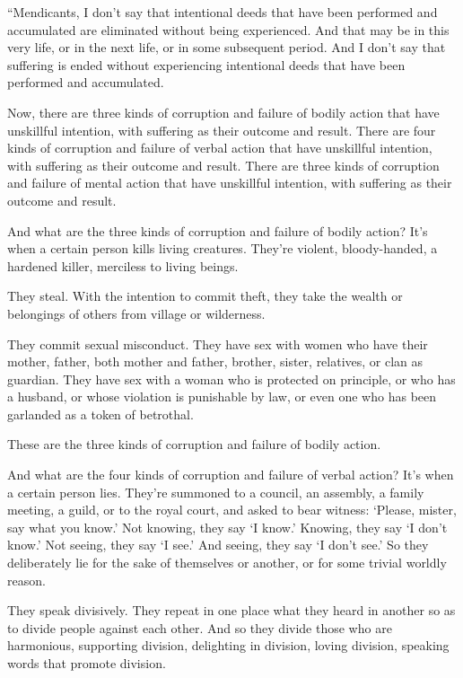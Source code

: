 \documentclass[12pt,openany]{book}%
\begin{document}
“Mendicants, I don’t say that intentional deeds that have been performed and accumulated are eliminated without being experienced. And that may be in this very life, or in the next life, or in some subsequent period. And I don’t say that suffering is ended without experiencing intentional deeds that have been performed and accumulated. 

Now, there are three kinds of corruption and failure of bodily action that have unskillful intention, with suffering as their outcome and result. There are four kinds of corruption and failure of verbal action that have unskillful intention, with suffering as their outcome and result. There are three kinds of corruption and failure of mental action that have unskillful intention, with suffering as their outcome and result. 

And what are the three kinds of corruption and failure of bodily action? It’s when a certain person kills living creatures. They’re violent, bloody-handed, a hardened killer, merciless to living beings. 

They steal. With the intention to commit theft, they take the wealth or belongings of others from village or wilderness. 

They commit sexual misconduct. They have sex with women who have their mother, father, both mother and father, brother, sister, relatives, or clan as guardian. They have sex with a woman who is protected on principle, or who has a husband, or whose violation is punishable by law, or even one who has been garlanded as a token of betrothal. 

These are the three kinds of corruption and failure of bodily action. 

And what are the four kinds of corruption and failure of verbal action? It’s when a certain person lies. They’re summoned to a council, an assembly, a family meeting, a guild, or to the royal court, and asked to bear witness: ‘Please, mister, say what you know.’ Not knowing, they say ‘I know.’ Knowing, they say ‘I don’t know.’ Not seeing, they say ‘I see.’ And seeing, they say ‘I don’t see.’ So they deliberately lie for the sake of themselves or another, or for some trivial worldly reason. 

They speak divisively. They repeat in one place what they heard in another so as to divide people against each other. And so they divide those who are harmonious, supporting division, delighting in division, loving division, speaking words that promote division. 
\end{document}
